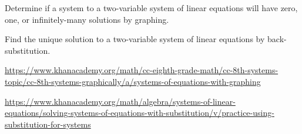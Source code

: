 
\begin{readinessAssuranceOutcomes}
\item Determine if a system to a two-variable system of linear equations
      will have zero, one, or infinitely-many solutions by graphing.
\item Find the unique solution to a two-variable system of linear equations
      by back-substitution.
\end{readinessAssuranceOutcomes}

\begin{readinessAssuranceResources}
\item \url{https://www.khanacademy.org/math/cc-eighth-grade-math/cc-8th-systems-topic/cc-8th-systems-graphically/a/systems-of-equations-with-graphing}
\item \url{https://www.khanacademy.org/math/algebra/systems-of-linear-equations/solving-systems-of-equations-with-substitution/v/practice-using-substitution-for-systems}
\end{readinessAssuranceResources}




